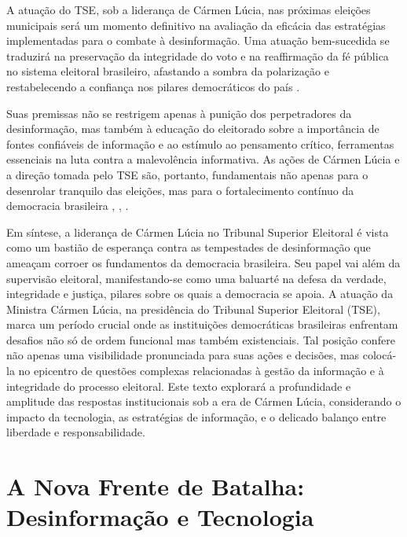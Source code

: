 \documentclass[
   article,       
   12pt,          
   oneside,       
   a4paper,       
   english,       
   brazil,        
   sumario=tradicional
   ]{abntex2}
\begin{document}
A atuação do TSE, sob a liderança de Cármen Lúcia, nas próximas eleições municipais será um momento definitivo na avaliação da eficácia das estratégias implementadas para o combate à desinformação. Uma atuação bem-sucedida se traduzirá na preservação da integridade do voto e na reaffirmação da fé pública no sistema eleitoral brasileiro, afastando a sombra da polarização e restabelecendo a confiança nos pilares democráticos do país \cite{Carmen_Lucia_tem_de_afastar_TSE_da_polarizaca}.

Suas premissas não se restrigem apenas à punição dos perpetradores da desinformação, mas também à educação do eleitorado sobre a importância de fontes confiáveis de informação e ao estímulo ao pensamento crítico, ferramentas essenciais na luta contra a malevolência informativa. As ações de Cármen Lúcia e a direção tomada pelo TSE são, portanto, fundamentais não apenas para o desenrolar tranquilo das eleições, mas para o fortalecimento contínuo da democracia brasileira \cite{Quem_centraliza_poderes_em_uma_pessoa_chamase;}, \cite{As_duas_preocupacoes_que_rondam_Carmen_Lucia_}, \cite{Pacheco_participa_da_posse_na_Carmen_Lucia_na}.

Em síntese, a liderança de Cármen Lúcia no Tribunal Superior Eleitoral é vista como um bastião de esperança contra as tempestades de desinformação que ameaçam corroer os fundamentos da democracia brasileira. Seu papel vai além da supervisão eleitoral, manifestando-se como uma baluarté na defesa da verdade, integridade e justiça, pilares sobre os quais a democracia se apoia.
A atuação da Ministra Cármen Lúcia, na presidência do Tribunal Superior Eleitoral (TSE), marca um período crucial onde as instituições democráticas brasileiras enfrentam desafios não só de ordem funcional mas também existenciais. Tal posição confere não apenas uma visibilidade pronunciada para suas ações e decisões, mas colocá-la no epicentro de questões complexas relacionadas à gestão da informação e à integridade do processo eleitoral. Este texto explorará a profundidade e amplitude das respostas institucionais sob a era de Cármen Lúcia, considerando o impacto da tecnologia, as estratégias de informação, e o delicado balanço entre liberdade e responsabilidade.

\section{A Nova Frente de Batalha: Desinformação e Tecnologia}
\end{document}

